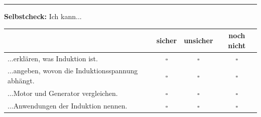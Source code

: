 \documentclass[a4paper,11pt]{article}
\begin{document}
\vspace{5mm}


\hrule
\vspace{3mm}

\textbf{Selbstcheck:} Ich kann...

\begin{tabularx}{\textwidth}{|X|c|c|c|}
\hline
& \textbf{sicher} & \textbf{unsicher} & \textbf{noch nicht} \\
\hline
...erklären, was Induktion ist. & $\square$ & $\square$ & $\square$ \\
\hline
...angeben, wovon die Induktionsspannung abhängt. & $\square$ & $\square$ & $\square$ \\
\hline
...Motor und Generator vergleichen. & $\square$ & $\square$ & $\square$ \\
\hline
...Anwendungen der Induktion nennen. & $\square$ & $\square$ & $\square$ \\
\hline
\end{tabularx}
\end{document}
